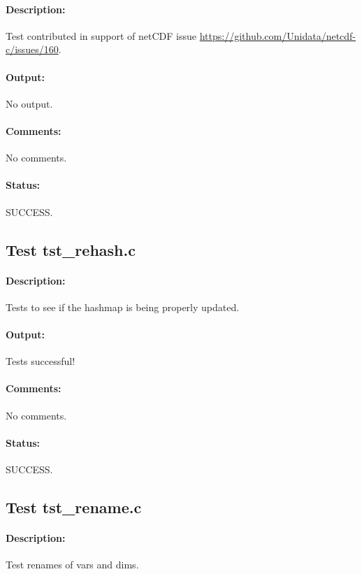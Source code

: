 \paragraph{Description:} Test contributed in support of netCDF issue \url{https://github.com/Unidata/netcdf-c/issues/160}.

\paragraph{Output:} No output.

\paragraph{Comments:} No comments.

\paragraph{Status:} SUCCESS.

\subsection{Test tst\_rehash.c}

\paragraph{Description:} Tests to see if the hashmap is being properly updated.

\paragraph{Output:} Tests successful!

\paragraph{Comments:} No comments.

\paragraph{Status:} SUCCESS.

\subsection{Test tst\_rename.c}

\paragraph{Description:} Test renames of vars and dims.

